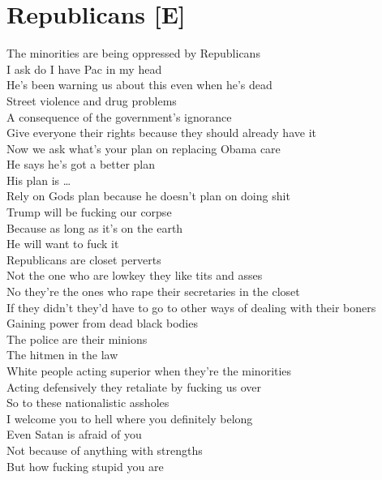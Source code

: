 \documentclass[12pt, b5paper, oneside]{book}
\begin{document}
\section{Republicans [E]}
The minorities are being oppressed by Republicans
\\I ask do I have Pac in my head
\\He's been warning us about this even when he's dead
\\Street violence and drug problems
\\A consequence of the government's ignorance
\\Give everyone their rights because they should already have it
\\Now we ask what's your plan on replacing Obama care
\\He says he's got a better plan
\\His plan is \dots 
\\Rely on Gods plan because he doesn't plan on doing shit
\\Trump will be fucking our corpse
\\Because as long as it's on the earth
\\He will want to fuck it
\\Republicans are closet perverts
\\Not the one who are lowkey they like tits and asses
\\No they're the ones who rape their secretaries in the closet
\\If they didn't they'd have to go to other ways of dealing with their boners
\\Gaining power from dead black bodies
\\The police are their minions
\\The hitmen in the law
\\White people acting superior when they're the minorities
\\Acting defensively they retaliate by fucking us over
\\So to these nationalistic assholes
\\I welcome you to hell where you definitely belong
\\Even Satan is afraid of you
\\Not because of anything with strengths
\\But how fucking stupid you are 
\newpage
\end{document}
